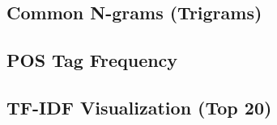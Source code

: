 \subsection{Common N-grams (Trigrams)}
\label{subsec:common-n-grams}


\subsection{POS Tag Frequency}
\label{subsec:pos-tag-frequency}


\subsection{TF-IDF Visualization (Top 20)}
\label{subsec:tf-idf-visualization}
